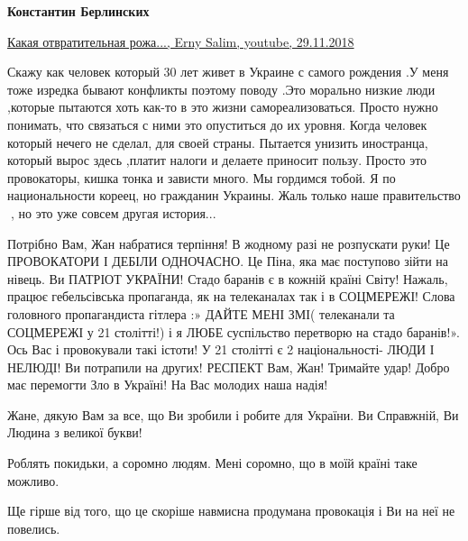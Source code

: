 \begin{itemize}
\begin{itemize}
\textbf{Константин Берлинских} 

\href{https://www.youtube.com/watch?v=yp13fHVo0Nw}{%
Какая отвратительная рожа..., Erny Salim, youtube, 29.11.2018%
}

\end{itemize}


Скажу как человек который 30 лет живет в Украине с самого рождения .У меня тоже
изредка бывают конфликты поэтому поводу .Это морально низкие люди ,которые
пытаются хоть как-то в это жизни самореализоваться. Просто нужно понимать, что
связаться с ними это опуститься до их уровня. Когда человек который нечего не
сделал, для своей страны. Пытается унизить иностранца, который вырос здесь
,платит налоги и делаете приносит пользу. Просто это провокаторы, кишка тонка и
зависти много. Мы гордимся тобой. Я по национальности кореец, но гражданин
Украины. Жаль только наше правительство 💩, но это уже совсем другая история...


Потрібно Вам, Жан набратися терпіння! В жодному разі не розпускати руки! Це
ПРОВОКАТОРИ І ДЕБІЛИ ОДНОЧАСНО. Це Піна, яка має поступово зійти на нівець. Ви
ПАТРІОТ УКРАЇНИ! Стадо баранів є в кожній країні Світу! Нажаль, працює
гебельсівська пропаганда, як на телеканалах так і в СОЦМЕРЕЖІ! Слова головного
пропагандиста гітлера :» ДАЙТЕ МЕНІ ЗМІ( телеканали та СОЦМЕРЕЖІ у 21
столітті!) і я ЛЮБЕ суспільство перетворю на стадо баранів!». Ось Вас і
провокували такі істоти! У 21 столітті є 2 національності- ЛЮДИ І НЕЛЮДІ! Ви
потрапили на других! РЕСПЕКТ Вам, Жан! Тримайте удар! Добро має перемогти Зло в
Україні! На Вас молодих наша надія!


Жане, дякую Вам за все, що Ви зробили і робите для України. Ви Справжній, Ви
Людина з великої букви!

Роблять покидьки, а соромно людям. Мені соромно, що в моїй країні таке можливо.

Ще гірше від того, що це скоріше навмисна продумана провокація і Ви на неї не
повелись. 🙌



\end{itemize}
